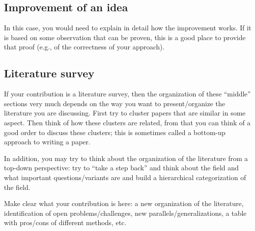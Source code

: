 \subsection*{Improvement of an idea}
In this case, you would need to explain in detail how the improvement works. If it is based on some observation that can be proven, this is a good place to provide that proof (e.g., of the correctness of your approach). 

\subsection*{Literature survey}
If your contribution is a literature survey, then the organization of these ``middle'' sections very much depends on the way you want to present/organize the literature you are discussing.
First try to cluster papers that are similar in some aspect. Then think of how these clusters are related, from that you can think of a good order to discuss these clusters; this is sometimes called a bottom-up approach to writing a paper.

In addition, you may try to think about the organization of the literature from a top-down perspective: try to ``take a step back'' and think about the field and what important questions/variants are and build a hierarchical categorization of the field.

Make clear what your contribution is here: a new organization of the literature, identification of open problems/challenges, new parallels/generalizations, a table with pros/cons of different methods, etc.\ 

